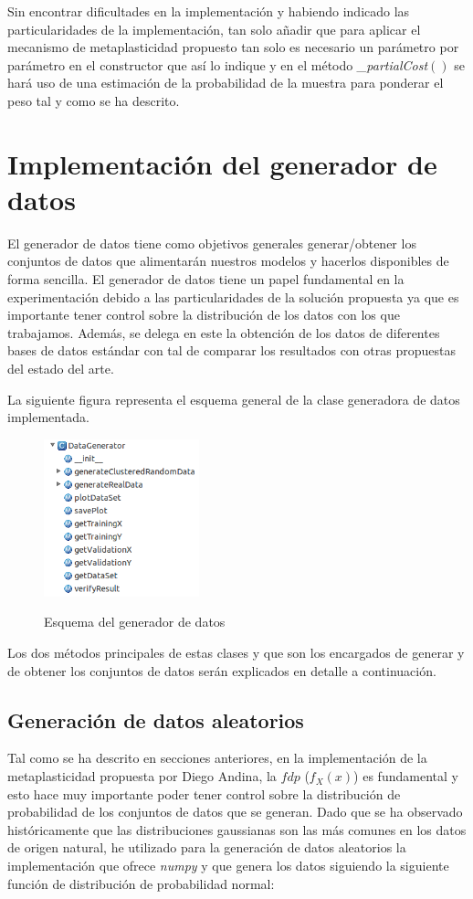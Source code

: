\documentclass[10pt,a4paper]{report}
\begin{document}
Sin encontrar dificultades en la implementación y habiendo indicado las particularidades de la implementación, tan solo añadir que para aplicar el mecanismo de metaplasticidad propuesto tan solo es necesario un parámetro por parámetro en el constructor que así lo indique y en el método \textit{\_partialCost$()$} se hará uso de una estimación de la probabilidad de la muestra para ponderar el peso tal y como se ha descrito.


\section{Implementación del generador de datos}
El generador de datos tiene como objetivos generales generar/obtener los conjuntos de datos que alimentarán nuestros modelos y hacerlos disponibles de forma sencilla. El generador de datos tiene un papel fundamental en la experimentación debido a las particularidades de la solución propuesta ya que es importante tener control sobre la distribución de los datos con los que trabajamos. Además, se delega en este la obtención de los datos de diferentes bases de datos estándar con tal de comparar los resultados con otras propuestas del estado del arte.

La siguiente figura representa el esquema general de la clase generadora de datos implementada.
\begin{figure}[h!]{}
    \centering
    \includegraphics[width=0.4\textwidth]{img/GeneradorEsquema.png}
    \label{fig:EsquemaGenerador}
    \caption{Esquema del generador de datos}
\end{figure}
Los dos métodos principales de estas clases y que son los encargados de generar y de obtener los conjuntos de datos serán explicados en detalle a continuación.

\subsection{Generación de datos aleatorios}
Tal como se ha descrito en secciones anteriores, en la implementación de la metaplasticidad propuesta por Diego Andina\citep{Andina2009}, la $fdp$ ($f_X(x)$) es fundamental y esto hace muy importante poder tener control sobre la distribución de probabilidad de los conjuntos de datos que se generan. Dado que se ha observado históricamente que las distribuciones gaussianas son las más comunes en los datos de origen natural, he utilizado para la generación de datos aleatorios la implementación que ofrece \textit{numpy} y que genera los datos siguiendo la siguiente función de distribución de probabilidad normal: 
\end{document}
